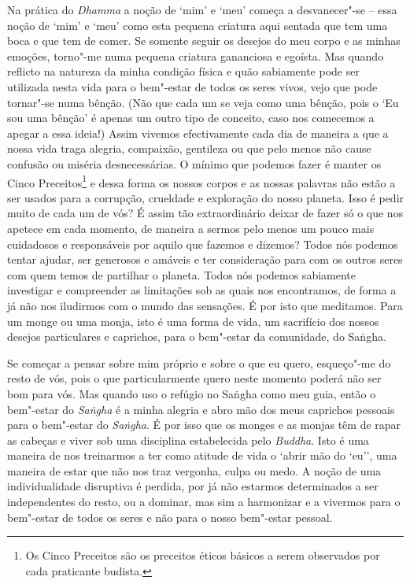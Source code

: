 Na prática do \emph{Dhamma} a noção de `mim' e `meu' começa a
desvanecer"-se -- essa noção de `mim' e `meu' como esta pequena criatura
aqui sentada que tem uma boca e que tem de comer. Se somente seguir os
desejos do meu corpo e as minhas emoções, torno"-me numa pequena criatura
gananciosa e egoísta. Mas quando reflicto na natureza da minha condição
física e quão sabiamente pode ser utilizada nesta vida para o bem"-estar
de todos os seres vivos, vejo que pode tornar"-se numa bênção. (Não que
cada um se veja como uma bênção, pois o `Eu sou uma bênção' é apenas um
outro tipo de conceito, caso nos comecemos a apegar a essa ideia!) Assim
vivemos efectivamente cada dia de maneira a que a nossa vida traga
alegria, compaixão, gentileza ou que pelo menos não cause confusão
ou miséria desnecessárias. O mínimo que podemos fazer é manter os Cinco
Preceitos\footnote{%
  Os Cinco Preceitos são os preceitos éticos básicos a serem observados
  por cada praticante budista.}
e dessa forma os nossos corpos e as nossas palavras não estão
a ser usados para a corrupção, crueldade e exploração do nosso planeta.
Isso é pedir muito de cada um de vós? É assim tão extraordinário deixar
de fazer só o que nos apetece em cada momento, de maneira a sermos pelo
menos um pouco mais cuidadosos e responsáveis por aquilo que fazemos e
dizemos? Todos nós podemos tentar ajudar, ser generosos e amáveis e ter
consideração para com os outros seres com quem temos de partilhar o
planeta. Todos nós podemos sabiamente investigar e compreender as
limitações sob as quais nos encontramos, de forma a já não nos iludirmos
com o mundo das sensações. É por isto que meditamos. Para um monge ou
uma monja, isto é uma forma de vida, um sacrifício dos nossos desejos
particulares e caprichos, para o bem"-estar da comunidade, do Saṅgha.

Se começar a pensar sobre mim próprio e sobre o que eu quero, esqueço"-me
do resto de vós, pois o que particularmente quero neste momento poderá
não ser bom para vós. Mas quando uso o refúgio no Saṅgha como meu guia,
então o bem"-estar do \emph{Saṅgha} é a minha alegria e abro mão dos meus
caprichos
pessoais para o bem"-estar do \emph{Saṅgha}. É por isso que os monges e
as monjas têm de rapar as cabeças e viver sob uma disciplina
estabelecida pelo \emph{Buddha}. Isto é uma maneira de nos treinarmos a
ter como atitude de vida o `abrir mão do `eu'', uma maneira de estar que
não nos traz vergonha, culpa ou medo. A noção de uma individualidade
disruptiva é perdida, por já não estarmos determinados a ser
independentes do resto, ou a dominar, mas sim a harmonizar e a vivermos
para o bem"-estar de todos os seres e não para o nosso bem"-estar pessoal.

